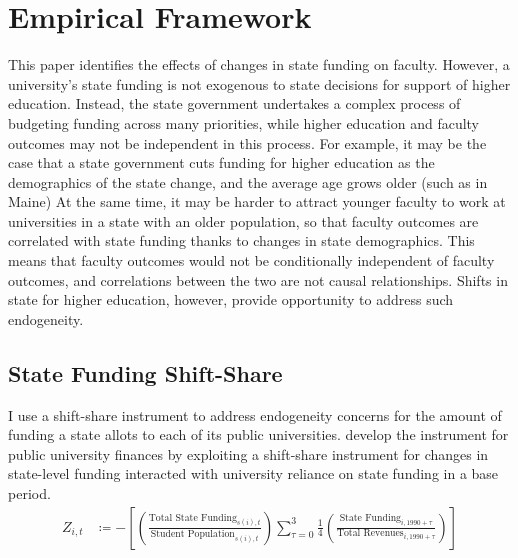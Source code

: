 \section{Empirical Framework}
\label{sec:empirics}

This paper identifies the effects of changes in state funding on faculty.
However, a university's state funding is not exogenous to state decisions for support of higher education.
Instead, the state government undertakes a complex process of budgeting funding across many priorities, while higher education and faculty outcomes may not be independent in this process.
For example, it may be the case that a state government cuts funding for higher education as the demographics of the state change, and the average age grows older (such as in Maine) 
At the same time, it may be harder to attract younger faculty to work at universities in a state with an older population, so that faculty outcomes are correlated with state funding thanks to changes in state demographics.
This means that faculty outcomes would not be conditionally independent of faculty outcomes, and correlations between the two are not causal relationships.
Shifts in state for higher education, however, provide opportunity to address such endogeneity.

\subsection{State Funding Shift-Share}
\label{sec:approp-shocks}

I use a shift-share instrument to address endogeneity concerns for the amount of funding a state allots to each of its public universities.
\cite{NBERw23736,NBERw27885} develop the instrument for public university finances by exploiting a shift-share instrument for changes in state-level funding interacted with university reliance on state funding in a base period.
\begin{align}
    \label{eqn:public-instrument}
    Z_{i,t} &\coloneqq - \left[
    \left( \frac{\text{Total State Funding}_{s(i),t}}{\text{Student Population}_{s(i),t}} \right)
    \sum_{\tau = 0}^{3} \frac 14
    \left( \frac{\text{State Funding}_{i,1990 + \tau}}{\text{Total Revenues}_{i,1990 + \tau}} \right) \right]
\end{align}

